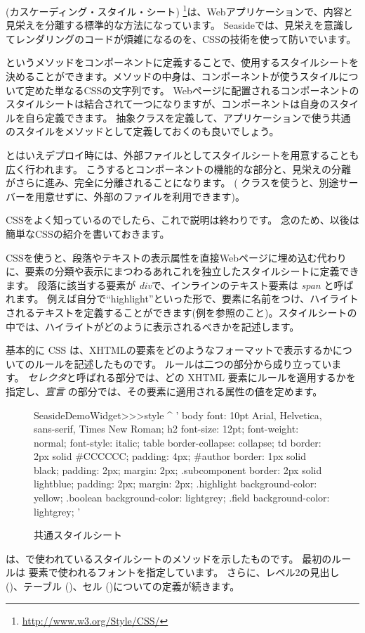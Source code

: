 \documentclass[a4paper,10pt,twoside]{book}
\begin{document}
(カスケーディング・スタイル・シート) \footnote{\url{http://www.w3.org/Style/CSS/}}は、Webアプリケーションで、内容と見栄えを分離する標準的な方法になっています。
Seasideでは、見栄えを意識してレンダリングのコードが煩雑になるのを、CSSの技術を使って防いでいます。

というメソッドをコンポーネントに定義することで、使用するスタイルシートを決めることができます。メソッドの中身は、コンポーネントが使うスタイルについて定めた単なるCSSの文字列です。
Webページに配置されるコンポーネントのスタイルシートは結合されて一つになりますが、コンポーネントは自身のスタイルを自ら定義できます。
抽象クラスを定義して、アプリケーションで使う共通のスタイルをメソッドとして定義しておくのも良いでしょう。

とはいえデプロイ時には、外部ファイルとしてスタイルシートを用意することも広く行われます。
こうするとコンポーネントの機能的な部分と、見栄えの分離がさらに進み、完全に分離されることになります。
( クラスを使うと、別途サーバーを用意せずに、外部のファイルを利用できます)。

CSSをよく知っているのでしたら、これで説明は終わりです。
念のため、以後は簡単なCSSの紹介を書いておきます。

CSSを使うと、段落やテキストの表示属性を直接Webページに埋め込む代わりに、要素の分類や表示にまつわるあれこれを独立したスタイルシートに定義できます。
段落に該当する要素が \emph{div}で、インラインのテキスト要素は \emph{span} と呼ばれます。
例えば自分で``highlight''といった形で、要素に名前をつけ、ハイライトされるテキストを定義することができます(例を参照のこと)。スタイルシートの中では、ハイライトがどのように表示されるべきかを記述します。

基本的に CSS は、XHTMLの要素をどのようなフォーマットで表示するかについてのルールを記述したものです。
ルールは二つの部分から成り立っています。
\emph{セレクタ}と呼ばれる部分では、どの XHTML 要素にルールを適用するかを指定し、\emph{宣言} の部分では、その要素に適用される属性の値を定めます。

\begin{figure}[tb]
\begin{code}{}
SeasideDemoWidget>>>style
	^ '
body {
	font: 10pt Arial, Helvetica, sans-serif, Times New Roman;
}
h2 {
	font-size: 12pt;
	font-weight: normal;
	font-style: italic;
}
table { border-collapse: collapse; }
td {
	border: 2px solid #CCCCCC;
	padding: 4px;
}
#author {
	border: 1px solid black;
	padding: 2px;
	margin: 2px;
}
.subcomponent {
	border: 2px solid lightblue;
	padding: 2px;
	margin: 2px;
}
.highlight { background-color: yellow; }
.boolean { background-color: lightgrey; }
.field { background-color: lightgrey; }
'
\end{code}
\caption{ 共通スタイルシート
}
\end{figure}
 は、で使われているスタイルシートのメソッドを示したものです。
最初のルールは 要素で使われるフォントを指定しています。
さらに、レベル2の見出し ()、テーブル ()、セル ()についての定義が続きます。
\end{document}
